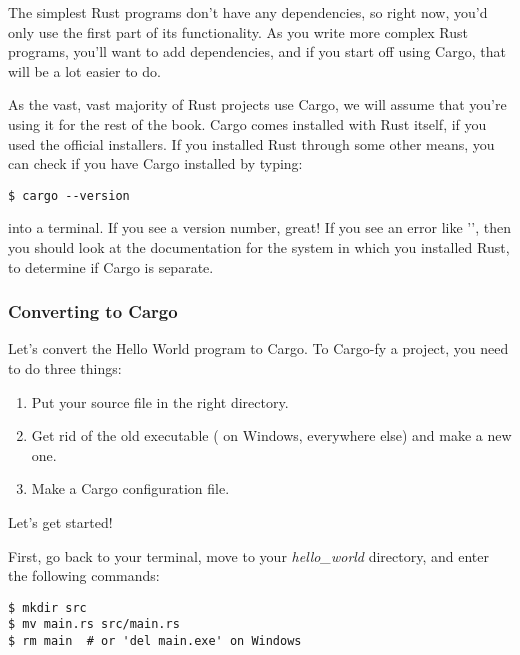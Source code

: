 \blank

The simplest Rust programs don't have any dependencies, so right now, you'd only use the first part of its functionality. 
As you write more complex Rust programs, you'll want to add dependencies, and if you start off using Cargo, that will be 
a lot easier to do.

\blank

As the vast, vast majority of Rust projects use Cargo, we will assume that you're using it for the rest of the book. 
Cargo comes installed with Rust itself, if you used the official installers. If you installed Rust through some other 
means, you can check if you have Cargo installed by typing:

\begin{verbatim}
$ cargo --version
\end{verbatim}

into a terminal. If you see a version number, great! If you see an error like '', then you should look 
at the documentation for the system in which you installed Rust, to determine if Cargo is separate.

\subsubsection*{Converting to Cargo}

Let's convert the Hello World program to Cargo. To Cargo-fy a project, you need to do three things:

\begin{enumerate}
    \item{Put your source file in the right directory.}
    \item{Get rid of the old executable ( on Windows,  everywhere else) and make a new one.}
    \item{Make a Cargo configuration file.}
\end{enumerate}

Let's get started!


First, go back to your terminal, move to your \emph{hello\_world} directory, and enter the following commands:

\begin{verbatim}
$ mkdir src
$ mv main.rs src/main.rs
$ rm main  # or 'del main.exe' on Windows 
\end{verbatim}

